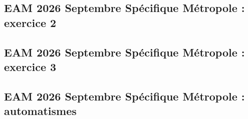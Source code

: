 \documentclass[lang=fr,edition=teacher,layout=sheet]{mxbook}
\begin{document}
\begingroup\endgroup
\par\bigskip
{}\subsection*{EAM 2026 Septembre Spécifique Métropole : exercice 2}
\begingroup\endgroup
\par\bigskip
{}\subsection*{EAM 2026 Septembre Spécifique Métropole : exercice 3}
\begingroup\endgroup
\par\bigskip
{}\subsection*{EAM 2026 Septembre Spécifique Métropole : automatismes}
\begingroup\endgroup
\par\bigskip
\end{document}
